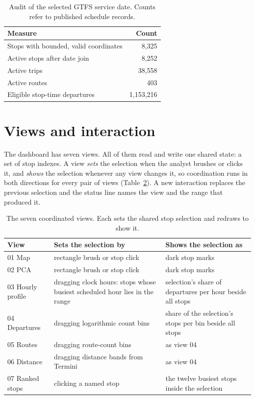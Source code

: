 \documentclass[10pt,a4paper]{article}
\begin{document}
\begin{table}[h]
\centering
\caption{Audit of the selected GTFS service date. Counts refer to published schedule records.}
\begin{tabular}{lr}
\toprule
Measure & Count \\
\midrule
Stops with bounded, valid coordinates & 8,325 \\
Active stops after date join & 8,252 \\
Active trips & 38,558 \\
Active routes & 403 \\
Eligible stop-time departures & 1,153,216 \\
\bottomrule
\end{tabular}
\label{tab:audit}
\end{table}

\section{Views and interaction}
The dashboard has seven views. All of them read and write one shared state: a set of stop indexes. A view \emph{sets} the selection when the analyst brushes or clicks it, and \emph{shows} the selection whenever any view changes it, so coordination runs in both directions for every pair of views (Table~\ref{tab:views}). A new interaction replaces the previous selection and the status line names the view and the range that produced it.

\begin{table}[h]
\centering
\caption{The seven coordinated views. Each sets the shared stop selection and redraws to show it.}
\label{tab:views}
\small
\begin{tabular}{p{.20\linewidth}p{.36\linewidth}p{.36\linewidth}}
\toprule
View & Sets the selection by & Shows the selection as \\
\midrule
01 Map & rectangle brush or stop click & dark stop marks \\
02 PCA & rectangle brush or stop click & dark stop marks \\
03 Hourly profile & dragging clock hours: stops whose busiest scheduled hour lies in the range & selection's share of departures per hour beside all stops \\
04 Departures & dragging logarithmic count bins & share of the selection's stops per bin beside all stops \\
05 Routes & dragging route-count bins & as view 04 \\
06 Distance & dragging distance bands from Termini & as view 04 \\
07 Ranked stops & clicking a named stop & the twelve busiest stops inside the selection \\
\bottomrule
\end{tabular}
\end{table}
\end{document}
